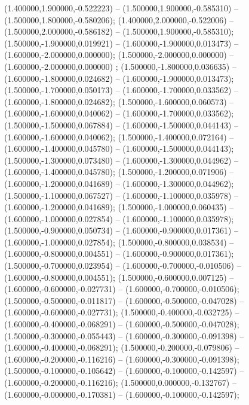  (1.400000,1.900000,-0.522223) -- (1.500000,1.900000,-0.585310) -- (1.500000,1.800000,-0.580206);
 (1.400000,2.000000,-0.522006) -- (1.500000,2.000000,-0.586182) -- (1.500000,1.900000,-0.585310);
 (1.500000,-1.900000,0.019921) -- (1.600000,-1.900000,0.013473) -- (1.600000,-2.000000,0.000000);
 (1.500000,-2.000000,0.000000) -- (1.600000,-2.000000,0.000000) ;
 (1.500000,-1.800000,0.036635) -- (1.600000,-1.800000,0.024682) -- (1.600000,-1.900000,0.013473);
 (1.500000,-1.700000,0.050173) -- (1.600000,-1.700000,0.033562) -- (1.600000,-1.800000,0.024682);
 (1.500000,-1.600000,0.060573) -- (1.600000,-1.600000,0.040062) -- (1.600000,-1.700000,0.033562);
 (1.500000,-1.500000,0.067884) -- (1.600000,-1.500000,0.044143) -- (1.600000,-1.600000,0.040062);
 (1.500000,-1.400000,0.072164) -- (1.600000,-1.400000,0.045780) -- (1.600000,-1.500000,0.044143);
 (1.500000,-1.300000,0.073480) -- (1.600000,-1.300000,0.044962) -- (1.600000,-1.400000,0.045780);
 (1.500000,-1.200000,0.071906) -- (1.600000,-1.200000,0.041689) -- (1.600000,-1.300000,0.044962);
 (1.500000,-1.100000,0.067527) -- (1.600000,-1.100000,0.035978) -- (1.600000,-1.200000,0.041689);
 (1.500000,-1.000000,0.060435) -- (1.600000,-1.000000,0.027854) -- (1.600000,-1.100000,0.035978);
 (1.500000,-0.900000,0.050734) -- (1.600000,-0.900000,0.017361) -- (1.600000,-1.000000,0.027854);
 (1.500000,-0.800000,0.038534) -- (1.600000,-0.800000,0.004551) -- (1.600000,-0.900000,0.017361);
 (1.500000,-0.700000,0.023954) -- (1.600000,-0.700000,-0.010506) -- (1.600000,-0.800000,0.004551);
 (1.500000,-0.600000,0.007125) -- (1.600000,-0.600000,-0.027731) -- (1.600000,-0.700000,-0.010506);
 (1.500000,-0.500000,-0.011817) -- (1.600000,-0.500000,-0.047028) -- (1.600000,-0.600000,-0.027731);
 (1.500000,-0.400000,-0.032725) -- (1.600000,-0.400000,-0.068291) -- (1.600000,-0.500000,-0.047028);
 (1.500000,-0.300000,-0.055443) -- (1.600000,-0.300000,-0.091398) -- (1.600000,-0.400000,-0.068291);
 (1.500000,-0.200000,-0.079806) -- (1.600000,-0.200000,-0.116216) -- (1.600000,-0.300000,-0.091398);
 (1.500000,-0.100000,-0.105642) -- (1.600000,-0.100000,-0.142597) -- (1.600000,-0.200000,-0.116216);
 (1.500000,0.000000,-0.132767) -- (1.600000,-0.000000,-0.170381) -- (1.600000,-0.100000,-0.142597);
